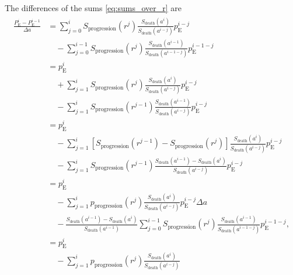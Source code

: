 \documentclass[12pt]{article}
\begin{document}
The differences of the sums \eqref{eq:sums_over_r} are
\begin{subequations}
  \begin{align}
    \begin{split}
      \frac{P_{\mathrm{E}}^i - P_{\mathrm{E}}^{i - 1}}{\Delta a}
      &=
      \sum_{j = 0}^i S_{\text{progression}}(r^j)
      \frac{S_{\text{death}}(a^i)}{S_{\text{death}}(a^{i - j})}
      p_{\mathrm{E}}^{i - j}
      \\ & \quad {}
      - \sum_{j = 0}^{i - 1} S_{\text{progression}}(r^j)
      \frac{S_{\text{death}}(a^{i - 1})}{S_{\text{death}}(a^{i - 1 - j})}
      p_{\mathrm{E}}^{i - 1 - j}
      \\
      &= p_{\mathrm{E}}^i
      \\ & \quad {}
      + \sum_{j = 1}^i S_{\text{progression}}(r^j)
      \frac{S_{\text{death}}(a^i)}{S_{\text{death}}(a^{i - j})}
      p_{\mathrm{E}}^{i - j}
      \\ & \quad {}
      - \sum_{j = 1}^i S_{\text{progression}}(r^{j - 1})
      \frac{S_{\text{death}}(a^{i - 1})}{S_{\text{death}}(a^{i - j})}
      p_{\mathrm{E}}^{i - j}
      \\
      &= p_{\mathrm{E}}^i
      \\ & \quad {}
      - \sum_{j = 1}^i
      \left[
        S_{\text{progression}}(r^{j - 1})
        - S_{\text{progression}}(r^j)
      \right]
      \frac{S_{\text{death}}(a^i)}{S_{\text{death}}(a^{i - j})}
      p_{\mathrm{E}}^{i - j}
      \\ & \quad {}
      - \sum_{j = 1}^i S_{\text{progression}}(r^{j - 1})
      \frac{S_{\text{death}}(a^{i - 1}) - S_{\text{death}}(a^i)}
      {S_{\text{death}}(a^{i - j})}
      p_{\mathrm{E}}^{i - j}
      \\
      &= p_{\mathrm{E}}^i
      \\ & \quad {}
      - \sum_{j = 1}^i p_{\text{progression}}(r^j)
      \frac{S_{\text{death}}(a^i)}{S_{\text{death}}(a^{i - j})}
      p_{\mathrm{E}}^{i - j} \Delta a
      \\ & \quad {}
      - \frac{S_{\text{death}}(a^{i - 1}) - S_{\text{death}}(a^i)}
      {S_{\text{death}}(a^{i - 1})}
      \sum_{j = 0}^{i - 1} S_{\text{progression}}(r^j)
      \frac{S_{\text{death}}(a^{i - 1})}{S_{\text{death}}(a^{i - 1 - j})}
      p_{\mathrm{E}}^{i - 1 - j},
      \\
      &= p_{\mathrm{E}}^i
      \\ & \quad {}
      - \sum_{j = 1}^i p_{\text{progression}}(r^j)
      \frac{S_{\text{death}}(a^i)}{S_{\text{death}}(a^{i - j})}

\end{split}
\end{align}
\end{subequations}
\end{document}
